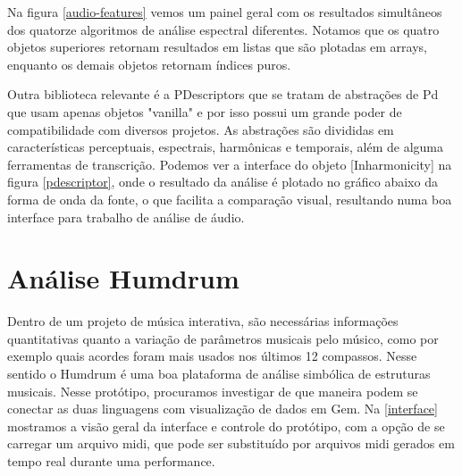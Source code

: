 \documentclass[draft]{ppgmus}
\begin{document}
Na figura \ref{audio-features} vemos um painel geral com os resultados simultâneos dos quatorze
algoritmos de análise espectral diferentes. Notamos que os quatro objetos superiores retornam resultados em 
listas que são plotadas em arrays, enquanto os demais objetos retornam índices puros.

Outra  biblioteca relevante é a PDescriptors \cite{monteiro} que se tratam
de abstrações de Pd que usam apenas objetos "vanilla" e por isso possui um
grande poder de compatibilidade com diversos projetos. As abstrações
são divididas em características perceptuais, espectrais, harmônicas e temporais, além
de alguma ferramentas de transcrição. Podemos ver a interface do objeto [Inharmonicity\texttildelow]
na figura \ref{pdescriptor}, onde o resultado da análise é plotado no gráfico abaixo da forma de 
onda da fonte, o que facilita a comparação visual, resultando numa boa interface para trabalho de análise de áudio.



\pagebreak 



\section{Análise Humdrum}

  Dentro de um projeto de música interativa, são necessárias informações quantitativas quanto a 
variação de parâmetros musicais pelo músico, como por exemplo quais acordes foram mais usados 
nos últimos 12 compassos.
Nesse sentido o Humdrum é uma boa plataforma de análise simbólica de estruturas musicais. 
Nesse protótipo, procuramos investigar de que maneira podem se conectar as duas linguagens 
com visualização de dados em Gem.
Na \ref{interface} mostramos a visão geral da interface e controle
do protótipo, com a opção de se carregar um arquivo midi, 
que pode ser substituído por arquivos midi gerados em tempo real 
durante uma performance.

\end{document}
